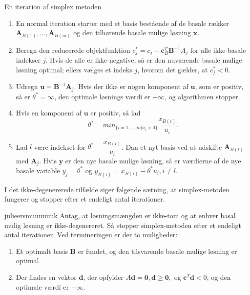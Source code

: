 En iteration af simplex metoden
\begin{enumerate}
\item En normal iteration starter med et basis bestående af de basale rækker $\textbf{A}_{B(1)},\ldots,\textbf{A}_{B(m)}$ og den tilhørende basale mulige løsning $\textbf{x}$.
\item Beregn den reducerede objektfunktion $c_j^* = c_j - \mathbf{c}_B^T \textbf{B}^{-1}A_j$ for alle ikke-basale indekser $j$. Hvis de alle er ikke-negative, så er den nuværende basale mulige løsning optimal; ellers vælges et indeks $j$, hvorom det gælder, at $c^*_j<0.$
\item Udregn $\textbf{u}=\textbf{B}^{-1}\textbf{A}_j$. Hvis der ikke er nogen komponent af $\textbf{u}$, som er positiv, så er $\theta ^*=\infty$, den optimale løsnings værdi er $-\infty$, og algorithmen stopper.
\item Hvis en komponent af $\textbf{u}$ er positiv, så lad 
$$\theta^*= min_{ \{i=1,\ldots,m|u_i>0 \} }        \dfrac{x_{B(i)}}{u_i}.$$
\item Lad $l$ være indekset for $\theta^*=  \dfrac{x_{B(l)}}{u_l}$. Dan et nyt basis ved at udskifte $\textbf{A}_{B(l)}$ med $\textbf{A}_j$. Hvis $\textbf{y}$ er den nye basale mulige løsning, så er værdierne af de nye basale variable $y_j=\theta^*$ og $y_{B(i)}=x_{B(i)}-\theta^*u_i,i\neq l.$
\end{enumerate}
%
%
I det ikke-degenererede tilfælde siger følgende sætning, at simplex-metoden fungerer og stopper efter et endeligt antal iterationer.
\begin{thm}{}{julieersmuuuuuuk}
Antag, at løsningsmængden er ikke-tom og at enhver basal mulig løsning er ikke-degenereret.
Så stopper simplex-metoden efter et endeligt antal iterationer. 
Ved termineringen er der to muligheder:
\begin{enumerate}[label = (\alph*)]
\item Et optimalt basis $\textbf{B}$ er fundet, og den tilsvarende basale mulige løsning er optimal.
\item Der findes en vektor $\textbf{d}$, der opfylder $A\textbf{d}= \mathbf{0},\textbf{d}\geq \mathbf{0},$ og $\textbf{c}^T\textbf{d}< 0$, og den optimale værdi er $-\infty$.
\end{enumerate}
\end{thm}
%
